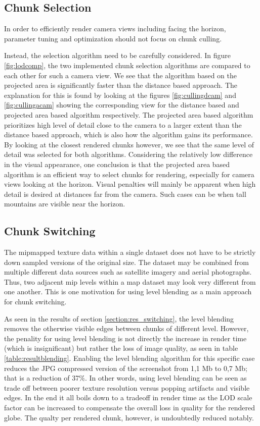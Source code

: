 \subsection{Chunk Selection}
\label{section:chunkselection}
In order to efficiently render camera views including facing the horizon, parameter tuning and optimization should not focus on chunk culling. 

Instead, the selection algorithm need to be carefully considered. 
In figure \ref{fig:lodcomp}, the two implemented chunk selection algorithms are compared to each other for such a camera view. 
We see that the algorithm based on the projected area is significantly faster than the distance based approach. 
The explanation for this is found by looking at the figures \ref{fig:cullingdcam} and \ref{fig:cullingacam} showing the corresponding view for the distance based and projected area based algorithm respectively. 
The projected area based algorithm prioritizes high level of detail close to the camera to a larger extent than the distance based approach, which is also how the algorithm gains its performance. 
By looking at the closest rendered chunks however, we see that the same level of detail was selected for both algorithms. 
Considering the relatively low difference in the visual appearance, one conclusion is that the projected area based algorithm is an efficient way to select chunks for rendering, especially for camera views looking at the horizon. Visual penalties will mainly be apparent when high detail is desired at distances far from the camera. Such cases can be when tall mountains are visible near the horizon.

\subsection{Chunk Switching}
The mipmapped texture data within a single dataset does not have to be strictly down sampled versions of the original size. 
The dataset may be combined from multiple different data sources such as satellite imagery and aerial photographs. 
Thus, two adjacent mip levels within a map dataset may look very different from one another. This is one motivation for using level blending as a main approach for chunk switching.

As seen in the results of section \ref{section:res_switching}, the level blending removes the otherwise visible edges between chunks of different level. However, the penality for using level blending is not directly the increase in render time (which is insignificant) but rather the loss of image quality, as seen in table \ref{table:resultblending}. Enabling the level blending algorithm for this specific case reduces the JPG compressed version of the screenshot from 1,1 Mb to 0,7 Mb; that is a reduction of 37\%. In other words, using level blending can be seen as trade off between poorer texture resolution versus popping artifacts and visible edges. In the end it all boils down to a tradeoff in render time as the LOD scale factor can be increased to compensate the overall loss in quality for the rendered globe. The qualty per rendered chunk, however, is undoubtedly reduced notably.

